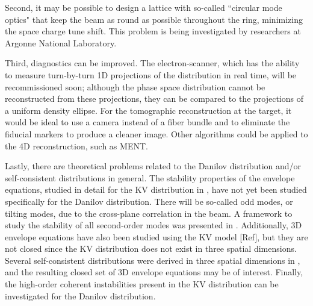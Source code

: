 Second, it may be possible to design a lattice with so-called ``circular mode optics" that keep the beam as round as possible throughout the ring, minimizing the space charge tune shift. This problem is being investigated by researchers at Argonne National Laboratory. 

Third, diagnostics can be improved. The electron-scanner, which has the ability to measure turn-by-turn 1D projections of the distribution in real time, will be recommissioned soon; although the phase space distribution cannot be reconstructed from these projections, they can be compared to the projections of a uniform density ellipse. For the tomographic reconstruction at the target, it would be ideal to use a camera instead of a fiber bundle and to eliminate the fiducial markers to produce a cleaner image. Other algorithms could be applied to the 4D reconstruction, such as MENT.

Lastly, there are theoretical problems related to the Danilov distribution and/or self-consistent distributions in general. The stability properties of the envelope equations, studied in detail for the KV distribution in \cite{Lund2004}, have not yet been studied specifically for the Danilov distribution. There will be so-called odd modes, or tilting modes, due to the cross-plane correlation in the beam. A framework to study the stability of all second-order modes was presented in \cite{Yuan2017}. Additionally, 3D envelope equations have also been studied using the KV model [Ref], but they are not closed since the KV distribution does not exist in three spatial dimensions. Several self-consistent distributions were derived in three spatial dimensions in \cite{Danilov2003}, and the resulting closed set of 3D envelope equations may be of interest. Finally, the high-order coherent instabilities present in the KV distribution can be investigated for the Danilov distribution.